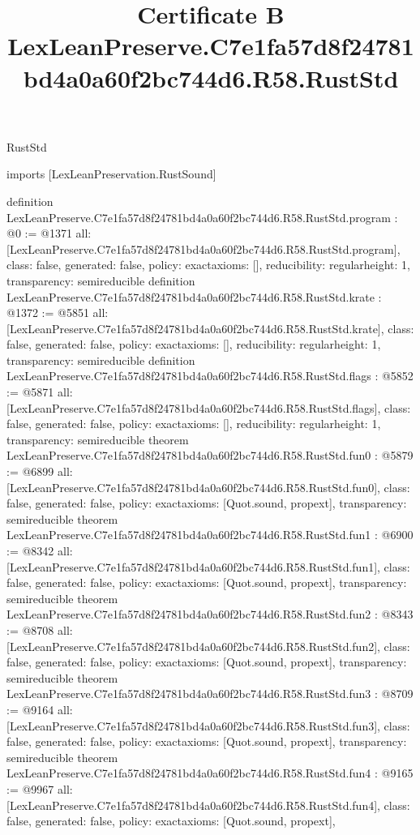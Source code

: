\begin{lexlean}{RustStd}
\title{Certificate B LexLeanPreserve.C7e1fa57d8f24781bd4a0a60f2bc744d6.R58.RustStd}
\begin{coremodule}
imports [LexLeanPreservation.RustSound]

definition LexLeanPreserve.C7e1fa57d8f24781bd4a0a60f2bc744d6.R58.RustStd.program : @0 := @1371 {
  all: [LexLeanPreserve.C7e1fa57d8f24781bd4a0a60f2bc744d6.R58.RustStd.program],
  class: false,
  generated: false,
  policy: exact{axioms: []},
  reducibility: regular{height: 1},
  transparency: semireducible
}
definition LexLeanPreserve.C7e1fa57d8f24781bd4a0a60f2bc744d6.R58.RustStd.krate : @1372 := @5851 {
  all: [LexLeanPreserve.C7e1fa57d8f24781bd4a0a60f2bc744d6.R58.RustStd.krate],
  class: false,
  generated: false,
  policy: exact{axioms: []},
  reducibility: regular{height: 1},
  transparency: semireducible
}
definition LexLeanPreserve.C7e1fa57d8f24781bd4a0a60f2bc744d6.R58.RustStd.flags : @5852 := @5871 {
  all: [LexLeanPreserve.C7e1fa57d8f24781bd4a0a60f2bc744d6.R58.RustStd.flags],
  class: false,
  generated: false,
  policy: exact{axioms: []},
  reducibility: regular{height: 1},
  transparency: semireducible
}
theorem LexLeanPreserve.C7e1fa57d8f24781bd4a0a60f2bc744d6.R58.RustStd.fun0 : @5879 := @6899 {
  all: [LexLeanPreserve.C7e1fa57d8f24781bd4a0a60f2bc744d6.R58.RustStd.fun0],
  class: false,
  generated: false,
  policy: exact{axioms: [Quot.sound, propext]},
  transparency: semireducible
}
theorem LexLeanPreserve.C7e1fa57d8f24781bd4a0a60f2bc744d6.R58.RustStd.fun1 : @6900 := @8342 {
  all: [LexLeanPreserve.C7e1fa57d8f24781bd4a0a60f2bc744d6.R58.RustStd.fun1],
  class: false,
  generated: false,
  policy: exact{axioms: [Quot.sound, propext]},
  transparency: semireducible
}
theorem LexLeanPreserve.C7e1fa57d8f24781bd4a0a60f2bc744d6.R58.RustStd.fun2 : @8343 := @8708 {
  all: [LexLeanPreserve.C7e1fa57d8f24781bd4a0a60f2bc744d6.R58.RustStd.fun2],
  class: false,
  generated: false,
  policy: exact{axioms: [Quot.sound, propext]},
  transparency: semireducible
}
theorem LexLeanPreserve.C7e1fa57d8f24781bd4a0a60f2bc744d6.R58.RustStd.fun3 : @8709 := @9164 {
  all: [LexLeanPreserve.C7e1fa57d8f24781bd4a0a60f2bc744d6.R58.RustStd.fun3],
  class: false,
  generated: false,
  policy: exact{axioms: [Quot.sound, propext]},
  transparency: semireducible
}
theorem LexLeanPreserve.C7e1fa57d8f24781bd4a0a60f2bc744d6.R58.RustStd.fun4 : @9165 := @9967 {
  all: [LexLeanPreserve.C7e1fa57d8f24781bd4a0a60f2bc744d6.R58.RustStd.fun4],
  class: false,
  generated: false,
  policy: exact{axioms: [Quot.sound, propext]},
}
\end{coremodule}
\end{lexlean}
